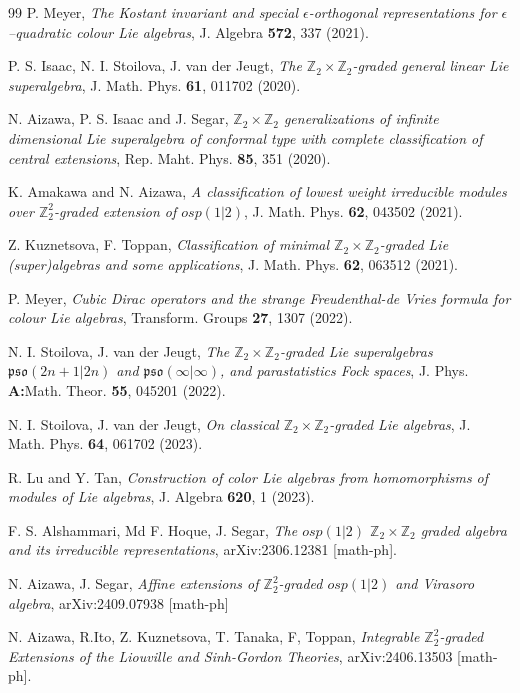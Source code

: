 \documentclass[a4paper,12pt]{article}
\theoremstyle{plain}
\theoremstyle{definition}
\begin{document}
\begin{thebibliography}{99}
 P. Meyer, 
\textit{The Kostant invariant and special $\epsilon$-orthogonal representations for $\epsilon$--quadratic colour Lie algebras}, 
J. Algebra \textbf{572}, 337 (2021).


 P. S. Isaac, N. I. Stoilova, J. van der Jeugt, 
\textit{The $\mathbb{Z}_2 \times \mathbb{Z}_2$-graded general linear Lie superalgebra},
J. Math. Phys. \textbf{61}, 011702 (2020).

N. Aizawa, P. S. Isaac and J. Segar, 
\textit{$\mathbb{Z}_2 \times \mathbb{Z}_2$ generalizations of infinite dimensional Lie superalgebra of conformal type with complete classification of central extensions}, 
Rep. Maht. Phys.  \textbf{85}, 351 (2020).

 K. Amakawa and N. Aizawa, 
\textit{A classification of lowest weight irreducible modules over $\mathbb{Z}_2^2$-graded extension of $osp(1|2)$}, 
J. Math. Phys. \textbf{62}, 043502 (2021).

 Z. Kuznetsova, F. Toppan, 
\textit{Classification of minimal $\mathbb{Z}_2 \times \mathbb{Z}_2$-graded Lie (super)algebras and some applications}, J. Math. Phys. \textbf{62}, 063512 (2021).


 P. Meyer, 
\textit{Cubic Dirac operators and the strange Freudenthal-de Vries formula for colour Lie algebras},
Transform. Groups  \textbf{27}, 1307 (2022).

 N. I. Stoilova, J. van der Jeugt, 
\textit{The ${\mathbb{Z}}_{2}\times {\mathbb{Z}}_{2}$-graded Lie superalgebras $\mathfrak{p}\mathfrak{s}\mathfrak{o}(2n+1\vert 2n)$ and $\mathfrak{p}\mathfrak{s}\mathfrak{o}(\infty \vert \infty )$, and parastatistics Fock spaces}, 
J. Phys. \textbf{A:}Math. Theor. \textbf{55}, 045201 (2022).



 N. I. Stoilova, J. van der Jeugt, 
\textit{On classical $\mathbb{Z}_2 \times \mathbb{Z}_2$-graded Lie algebras}, 
J. Math. Phys. \textbf{64}, 061702 (2023). 

 R. Lu and Y. Tan, 
\textit{Construction of color Lie algebras from homomorphisms of modules of Lie algebras}, 
J. Algebra \textbf{620}, 1 (2023).


 F. S. Alshammari, Md F. Hoque, J. Segar, 
\textit{The $osp(1|2)$ $ \mathbb{Z}_2 \times \mathbb{Z}_2$ graded algebra and its irreducible representations}, 
arXiv:2306.12381 [math-ph]. 

 N. Aizawa, J. Segar,
\textit{Affine extensions of $\mathbb{Z}_2^2$-graded $osp(1|2)$ and Virasoro algebra},
arXiv:2409.07938 [math-ph]

N. Aizawa, R.Ito, Z. Kuznetsova, T. Tanaka, F, Toppan,
\textit{Integrable $\mathbb{Z}_2^2$-graded Extensions of the Liouville and Sinh-Gordon Theories},
arXiv:2406.13503 [math-ph].


\end{thebibliography}
\end{document}
